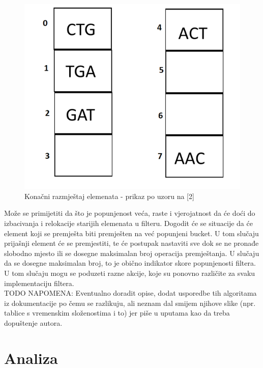 \documentclass[times, utf8, seminar, numeric]{fer}
\begin{document}
\begin{figure}[H]
  \centering
  \setlength{\intextsep}{5pt}
  \includegraphics[scale = 0.4]{images/finalalign.png}
  \caption{Konačni razmještaj elemenata - prikaz po uzoru na [2]}
  \label{fig_finalalign}
\end{figure}

Može se primijetiti da što je popunjenost veća, raste i vjerojatnost da će doći do izbacivanja i relokacije starijih elemenata u filteru. Dogodit će se situacije da će element koji se premješta biti premješten na već popunjeni bucket. U tom slučaju prijašnji element će se premjestiti, te će postupak nastaviti sve dok se ne pronađe slobodno mjesto ili se dosegne maksimalan broj operacija premještanja. U slučaju da se dosegne maksimalan broj, to je obično indikator skore popunjenosti filtera. U tom slučaju mogu se poduzeti razne akcije, koje su ponovno različite za svaku implementaciju filtera. \\

TODO NAPOMENA: Eventualno doradit opise, dodat usporedbe tih algoritama iz dokumentacije po čemu se razlikuju, ali neznam dal smijem njihove slike (npr. tablice s vremenskim složenostima i to) jer piše u uputama kao da treba dopuštenje autora. 

 
\chapter{Analiza}
\label{Analiza}
\end{document}
